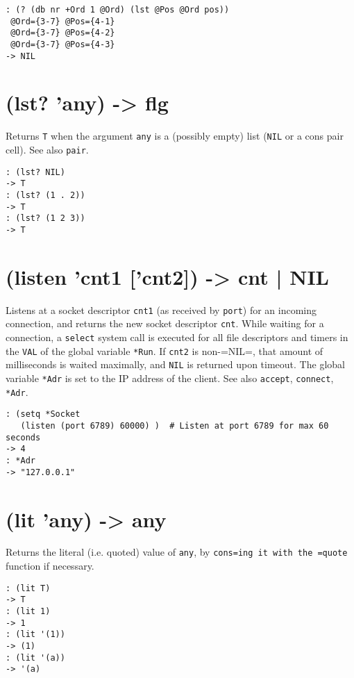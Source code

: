 {{{{{{\begin{verbatim}
: (? (db nr +Ord 1 @Ord) (lst @Pos @Ord pos))
 @Ord={3-7} @Pos={4-1}
 @Ord={3-7} @Pos={4-2}
 @Ord={3-7} @Pos={4-3}
-> NIL
\end{verbatim}

 
\section{(lst? 'any) -> flg}
\label{sec-8-1-12-21}


Returns \texttt{T} when the argument \texttt{any} is a (possibly empty) list (\texttt{NIL} or
a cons pair cell). See also \texttt{pair}.


\begin{verbatim}
: (lst? NIL)
-> T
: (lst? (1 . 2))
-> T
: (lst? (1 2 3))
-> T
\end{verbatim}

 
\section{(listen 'cnt1 ['cnt2]) -> cnt | NIL}
\label{sec-8-1-12-22}


Listens at a socket descriptor \texttt{cnt1} (as received by \texttt{port}) for an
incoming connection, and returns the new socket descriptor \texttt{cnt}. While
waiting for a connection, a \texttt{select} system call is executed for all
file descriptors and timers in the \texttt{VAL} of the global variable \texttt{*Run}.
If \texttt{cnt2} is non-=NIL=, that amount of milliseconds is waited maximally,
and \texttt{NIL} is returned upon timeout. The global variable \texttt{*Adr} is set to
the IP address of the client. See also \texttt{accept}, \texttt{connect}, \texttt{*Adr}.


\begin{verbatim}
: (setq *Socket
   (listen (port 6789) 60000) )  # Listen at port 6789 for max 60 seconds
-> 4
: *Adr
-> "127.0.0.1"
\end{verbatim}

 
\section{(lit 'any) -> any}
\label{sec-8-1-12-23}


Returns the literal (i.e. quoted) value of \texttt{any}, by \texttt{cons=ing it with the =quote} function if necessary.


\begin{verbatim}
: (lit T)
-> T
: (lit 1)
-> 1
: (lit '(1))
-> (1)
: (lit '(a))
-> '(a)
\end{verbatim}

}}}}}}
